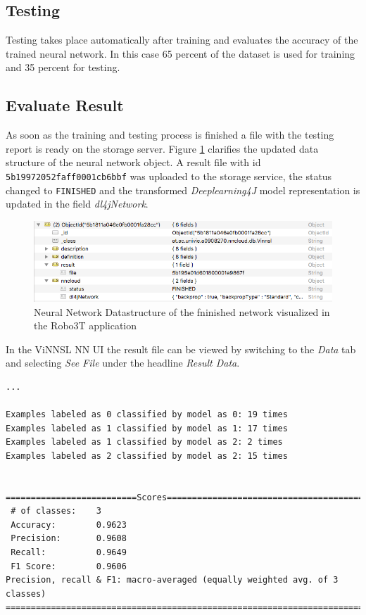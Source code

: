 \cite{dl4j-traininui}

\subsection{Testing}\label{testing}

Testing takes place automatically after training and evaluates the
accuracy of the trained neural network. In this case 65 percent of the
dataset is used for training and 35 percent for testing.

\subsection{Evaluate Result}\label{evaluate-result}

As soon as the training and testing process is finished a file with the
testing report is ready on the storage server. Figure
\ref{usecase_1_datastructure_finished} clarifies the updated data
structure of the neural network object. A result file with id
\texttt{5b19972052faff0001cb6bbf} was uploaded to the storage service,
the status changed to \texttt{FINISHED} and the transformed
\emph{Deeplearning4J} model representation is updated in the field
\emph{dl4jNetwork}.

\begin{figure}
\centering
\includegraphics[width=12.00000cm]{images/usecase_1_datastructure_finished}
\caption[Neural Network Datastructure of the fninished network
visualized in the Robo3T application
\label{usecase_1_datastructure_finished}]{Neural Network Datastructure
of the fninished network visualized in the Robo3T\footnotemark{}
application \label{usecase_1_datastructure_finished}}
\end{figure}

In the ViNNSL NN UI the result file can be viewed by switching to the
\emph{Data} tab and selecting \emph{See File} under the headline
\emph{Result Data}.

\begin{verbatim}
...

Examples labeled as 0 classified by model as 0: 19 times
Examples labeled as 1 classified by model as 1: 17 times
Examples labeled as 1 classified by model as 2: 2 times
Examples labeled as 2 classified by model as 2: 15 times


==========================Scores===========================================
 # of classes:    3
 Accuracy:        0.9623
 Precision:       0.9608
 Recall:          0.9649
 F1 Score:        0.9606
Precision, recall & F1: macro-averaged (equally weighted avg. of 3 classes)
===========================================================================
\end{verbatim}

